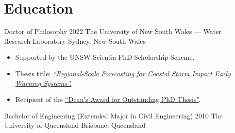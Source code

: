 \section{Education}

	\entrytable%
	{Doctor of Philosophy}
	{2022}
	{}
	{The University of New South Wales --- Water Research Laboratory}
	{Sydney, New South Wales}
	{\begin{itemize}
			\item Supported by the UNSW Scientia PhD Scholarship Scheme.
			\item Thesis title: \href{https://unsworks.unsw.edu.au/entities/publication/dd04df5e-b0bf-4114-b408-4961af02c852}{\textit{``Regional-Scale Forecasting for Coastal Storm Impact Early Warning Systems''.}}
			\item Recipient of the \href{https://www.inside.unsw.edu.au/awards/2022-deans-awards-outstanding-phd-theses}{``Dean's Award for Outstanding PhD Thesis''}.
		\end{itemize}
	}

	\entrytable%
	{Bachelor of Engineering {\normalfont (Extended Major in Civil Engineering)}}
	{2010}
	{}
	{The University of Queensland}
	{Brisbane, Queensland}
	{\vspace{-3\parskip}}